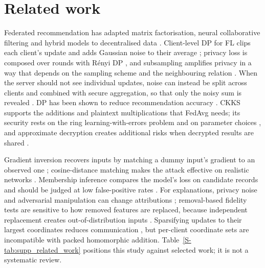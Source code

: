 \documentclass[11pt,a4paper]{article}
\begin{document}
\section{Related work}

Federated recommendation has adapted matrix factorisation, neural collaborative filtering and hybrid models to decentralised data \cite{tan2020federated,zhang2023comprehensive,yang2024federated,gaspar2026literature}. Client-level DP for FL clips each client's update and adds Gaussian noise to their average \cite{mcmahan2018learning}; privacy loss is composed over rounds with R\'enyi DP \cite{mironov2017renyi}, and subsampling amplifies privacy in a way that depends on the sampling scheme and the neighbouring relation \cite{balle2018privacy,wang2019subsampled}. When the server should not see individual updates, noise can instead be split across clients and combined with secure aggregation, so that only the noisy sum is revealed \cite{kairouz2021distributed,bonawitz2017practical}. DP has been shown to reduce recommendation accuracy \cite{hua2020differential,shin2023differentially}. CKKS supports the additions and plaintext multiplications that FedAvg needs; its security rests on the ring learning-with-errors problem and on parameter choices \cite{albrecht2018homomorphic}, and approximate decryption creates additional risks when decrypted results are shared \cite{li2021security}.

Gradient inversion recovers inputs by matching a dummy input's gradient to an observed one \cite{zhu2019deep}; cosine-distance matching makes the attack effective on realistic networks \cite{geiping2020inverting}. Membership inference compares the model's loss on candidate records \cite{yeom2018privacy} and should be judged at low false-positive rates \cite{carlini2022membership}. For explanations, privacy noise and adversarial manipulation can change attributions \cite{harder2020differentially,slack2020fooling,dombrowski2019explanations}; removal-based fidelity tests are sensitive to how removed features are replaced, because independent replacement creates out-of-distribution inputs \cite{hooker2019benchmark,aas2021explaining}. Sparsifying updates to their largest coordinates reduces communication \cite{lin2018deep}, but per-client coordinate sets are incompatible with packed homomorphic addition. Table~\ref{S-tab:supp_related_work} positions this study against selected work; it is not a systematic review.
\end{document}
